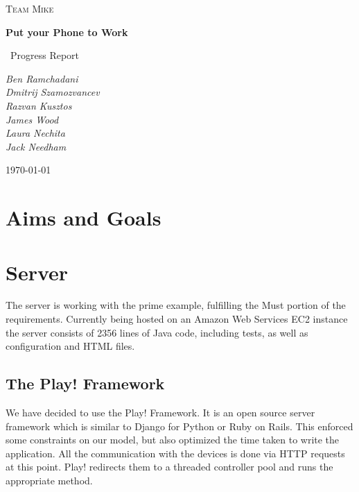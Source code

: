 \documentclass[a4paper,10pt]{article}
\title{}
\author{}
\date{}
\begin{document}
\begin{titlepage}
	\centering
	
	{\scshape\Large Team Mike\par}
	\vspace{4cm}
	{\huge\bfseries Put your Phone to Work\par}
	\vspace{1.5cm}
	{\Large\
	Progress Report
	\par}
	\vspace{2cm}
	{\Large\itshape 
	      Ben Ramchadani\\
	      Dmitrij Szamozvancev\\
	      Razvan Kusztos\\
	      James Wood \\
	      Laura Nechita \\
	      Jack Needham
	      \par}
	\vfill

	{\large \today\par}
\end{titlepage}
\maketitle
\tableofcontents
\newpage
\section{Aims and Goals}
\section{Server}

The server is working with the prime example, fulfilling the Must portion of the requirements.
Currently being hosted on an Amazon Web Services EC2 instance the server consists of 2356 lines of Java code, including tests,
as well as configuration and HTML files.


\subsection{The Play! Framework}
We have decided to use the Play! Framework. It is an open source server framework which is similar to Django for Python or Ruby on Rails. This enforced some constraints on our model, but also optimized the time taken to write the application. 
All the communication with the devices is done via HTTP requests at this point. Play! redirects them to a threaded controller pool and runs the appropriate method.
\end{document}

